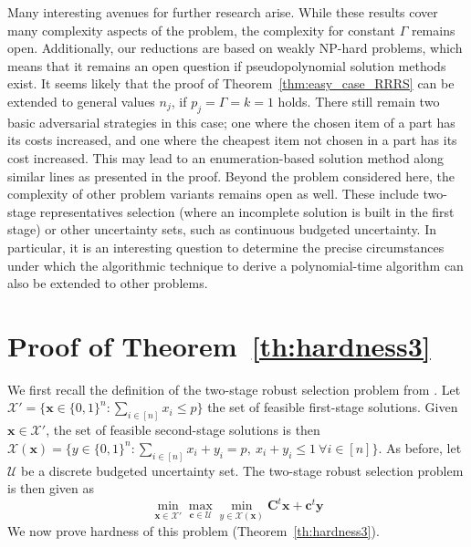 \documentclass[a4paper,11pt,abstracton]{scrartcl}
\theoremstyle{definition}
\theoremstyle{remark}
\newcommand{\X}{\mathcal{X}}
\newcommand{\cU}{\mathcal{U}}
\begin{document}
Many interesting avenues for further research arise. 
While these results cover many complexity aspects of the problem, the complexity for constant $\Gamma$ remains open. Additionally, our reductions are based on weakly NP-hard problems, which means that it remains an open question if pseudopolynomial solution methods exist.
It seems likely that the proof of Theorem~\ref{thm:easy_case_RRRS} can be extended to general values $n_j$, if $p_j=\Gamma = k = 1$ holds. There still remain two basic adversarial strategies in this case; one where the chosen item of a part has its costs increased, and one where the cheapest item not chosen in a part has its cost increased. This may lead to an enumeration-based solution method along similar lines as presented in the proof.
Beyond the problem considered here, the complexity of other problem variants remains open as well. These include two-stage representatives selection (where an incomplete solution is built in the first stage) or other uncertainty sets, such as continuous budgeted uncertainty. In particular, it is an interesting question to determine the precise circumstances under which the algorithmic technique to derive a polynomial-time algorithm can also be extended to other problems.





\appendix


\section{Proof of Theorem~\ref{th:hardness3}}

We first recall the definition of the two-stage robust selection problem from \cite{chassein2018recoverable}. Let $\X' = \{ \pmb{x}\in\{0,1\}^n : \sum_{i\in[n]} x_i \le p\}$ the set of feasible first-stage solutions. Given $\pmb{x}\in\X'$, the set of feasible second-stage solutions is then $\X(\pmb{x}) = \{ y\in\{0,1\}^n : \sum_{i\in[n]} x_i + y_i = p,\ x_i+ y_i \le 1 \ \forall i\in[n]\}$. As before, let $\cU$ be a discrete budgeted uncertainty set. The two-stage robust selection problem is then given as
\[ \min_{\pmb{x}\in\X'} \max_{\pmb{c}\in\cU} \min_{y\in\X(\pmb{x})} \pmb{C}^t\pmb{x} + \pmb{c}^t\pmb{y} \]
We now prove hardness of this problem (Theorem~\ref{th:hardness3}).
\end{document}
